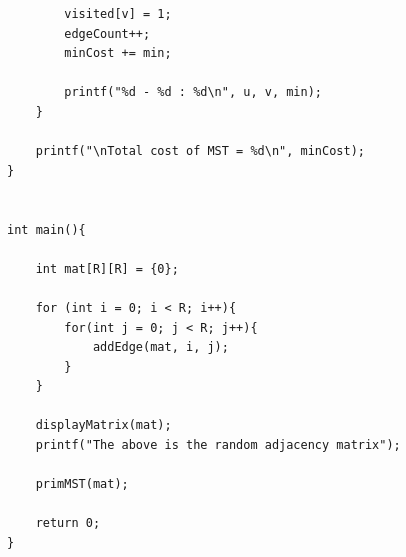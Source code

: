 \documentclass[a4paper,12pt]{article}
\begin{document}
\begin{lstlisting}
        visited[v] = 1;
        edgeCount++;
        minCost += min;

        printf("%d - %d : %d\n", u, v, min);
    }

    printf("\nTotal cost of MST = %d\n", minCost);
}


int main(){
    
    int mat[R][R] = {0};
    
    for (int i = 0; i < R; i++){
        for(int j = 0; j < R; j++){
            addEdge(mat, i, j);     
        }
    }

    displayMatrix(mat); 
    printf("The above is the random adjacency matrix");

    primMST(mat);

    return 0;
} 
\end{lstlisting}
\end{document}
